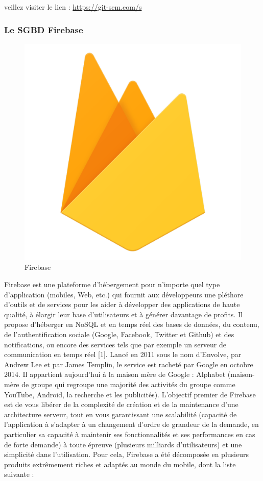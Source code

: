 veillez
visiter le lien :
\href{https://git-scm.com/s}{https://git-scm.com/s}
\subsubsection{Le SGBD Firebase}
\begin{figure}[h]
	\includegraphics[scale=0.1]{./Template LaTeX/Images/firebase.png}
	\centering
	\caption{Firebase}
\end{figure}
Firebase est une plateforme d’hébergement pour n’importe quel type d’application (mobiles,
Web, etc.) qui fournit aux développeurs une pléthore d'outils et de services pour les aider à
développer des applications de haute qualité, à élargir leur base d'utilisateurs et à générer
davantage de profits. Il propose d'héberger en NoSQL et en temps réel des bases de données,
du contenu, de l'authentification sociale (Google, Facebook, Twitter et Github) et des notifications, ou encore des services tels que par exemple un serveur de communication en
temps réel [1].
Lancé en 2011 sous le nom d'Envolve, par Andrew Lee et par James Templin, le service est
racheté par Google en octobre 2014. Il appartient aujourd'hui à la maison mère de Google :
Alphabet (maison-mère de groupe qui regroupe une majorité des activités du groupe comme
YouTube, Android, la recherche et les publicités). L'objectif premier de Firebase est de vous
libérer de la complexité de création et de la maintenance d'une architecture serveur, tout en vous
garantissant une scalabilité (capacité de l’application à s'adapter à un changement d'ordre de
grandeur de la demande, en particulier sa capacité à maintenir ses fonctionnalités et ses
performances en cas de forte demande) à toute épreuve (plusieurs milliards d'utilisateurs) et une
simplicité dans l'utilisation. Pour cela, Firebase a été décomposée en plusieurs produits
extrêmement riches et adaptés au monde du mobile, dont la liste suivante :
\setcounter{secnumdepth}{5}

